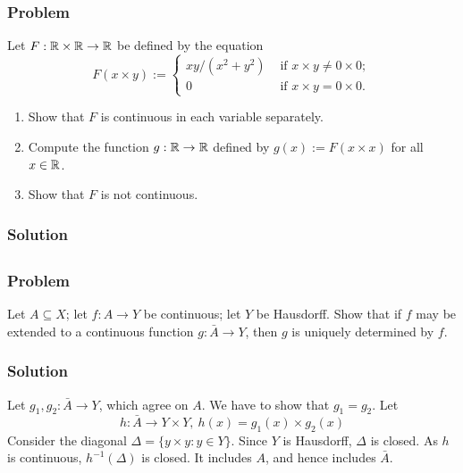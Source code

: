 \subsubsection{Problem}
Let $F : \mathbb R \times \mathbb R \to \mathbb R$ be defined by the equation
\[
F(x \times y) := 
\left\{ \begin{array}{ll}
    xy/(x^2+y^2) & \mbox{ if } x \times y \neq 0 \times 0 ; \\
    0 & \mbox{ if } x \times y = 0 \times 0.
\end{array} \right.
\]
\begin{enumerate}
    \item Show that $F$ is continuous in each variable separately.
    \item Compute the function $g : \mathbb R \to \mathbb R$ defined by $g(x) := F(x \times x)$ for all $x \in \mathbb R$.
    \item Show that $F$ is not continuous.
\end{enumerate}

\subsubsection{Solution}
\todo


\subsection{}

\subsubsection{Problem}
Let $A \subseteq X$; let $f : A \to Y$ be continuous; let $Y$ be Hausdorff. Show that if $f$ may be extended to a continuous function $g : \bar A \to Y$, then $g$ is uniquely determined by $f$.

\subsubsection{Solution}
Let $g_1, g_2 : \bar A \to Y$, which agree on $A$. We have to show that $g_1 = g_2$. Let
\[h : \bar A \to Y \times Y,\ h(x) = g_1(x) \times g_2(x) \]
Consider the diagonal $\Delta = \{ y \times y : y \in Y\}$. Since $Y$ is Hausdorff, $\Delta$ is closed. As $h$ is continuous, $h^{-1}(\Delta)$ is closed. It includes $A$, and hence includes $\bar A$.
